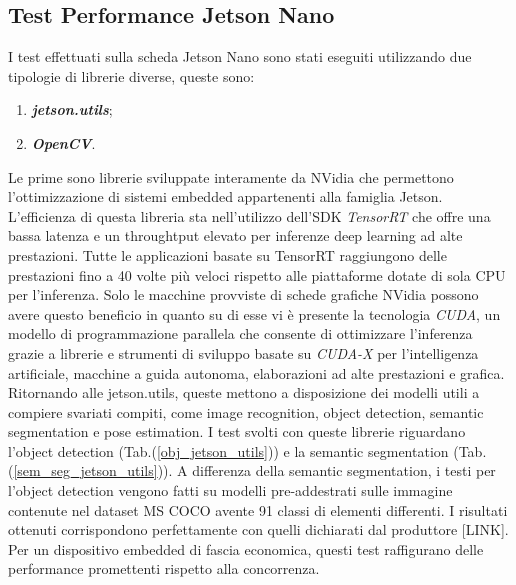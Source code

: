 \subsection{Test Performance Jetson Nano}
I test effettuati sulla scheda Jetson Nano sono stati eseguiti utilizzando due 
tipologie di librerie diverse, queste sono:
\begin{enumerate}
    \item {\bfseries{\emph{jetson.utils}}};
    \item {\bfseries{\emph{OpenCV}}}.
\end{enumerate}
Le prime sono librerie sviluppate interamente da NVidia che permettono l'ottimizzazione di sistemi embedded appartenenti alla famiglia Jetson. L'efficienza di questa libreria sta nell'utilizzo dell'SDK \emph{TensorRT} che offre una bassa latenza e un throughtput elevato per inferenze deep learning ad alte prestazioni. Tutte le applicazioni basate su TensorRT raggiungono delle prestazioni fino a 40 volte più veloci rispetto alle piattaforme dotate di sola CPU per l'inferenza. Solo le macchine provviste di schede grafiche NVidia possono avere questo beneficio in quanto su di esse vi è presente la tecnologia \emph{CUDA}, un modello di programmazione parallela che consente di ottimizzare l'inferenza grazie a librerie e strumenti di sviluppo basate su \emph{CUDA-X} per l'intelligenza artificiale, macchine a guida autonoma, elaborazioni ad alte prestazioni e grafica. Ritornando alle jetson.utils, queste mettono a disposizione dei modelli utili a compiere svariati compiti, come image recognition, object detection, semantic segmentation e pose estimation. 
I test svolti con queste librerie riguardano l'object detection (Tab.(\ref{obj_jetson_utils})) e la semantic segmentation (Tab.(\ref{sem_seg_jetson_utils})). A differenza della semantic segmentation, i testi per l'object detection vengono fatti su modelli pre-addestrati sulle immagine contenute nel dataset MS COCO avente 91 classi di elementi differenti. I risultati ottenuti corrispondono perfettamente con quelli dichiarati dal produttore [LINK]. Per un dispositivo embedded di fascia economica, questi test raffigurano delle performance promettenti rispetto alla concorrenza.

